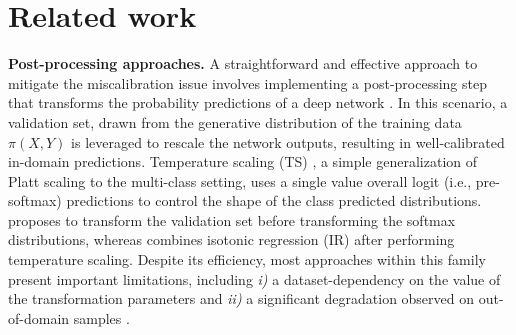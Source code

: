 \documentclass[twocolumn,final,10pt]{elsarticle}
\begin{document}
\section{Related work}
\label{sec:related}

\noindent \textbf{Post-processing approaches.} A straightforward and effective approach to mitigate the miscalibration issue involves implementing a post-processing step that transforms the probability predictions of a deep network \citep{guo2017calibration, zhang2020mix, tomani2021post}. In this scenario, a validation set, drawn from the generative distribution of the training data $\pi (X, Y)$ is leveraged to rescale the network outputs, resulting in well-calibrated in-domain predictions. Temperature scaling (TS) \citep{guo2017calibration}, a simple generalization of Platt scaling \citep{platt1999probabilistic} to the multi-class setting, %
uses a single value overall logit (i.e., pre-softmax) predictions to control the shape of the class predicted distributions. %
\citep{tomani2021post} proposes to transform the validation set before transforming the softmax distributions, whereas \citep{zhang2020mix} combines isotonic regression (IR) after performing temperature scaling.  %
Despite its efficiency, most approaches within this family present important limitations, including \textit{i)} a dataset-dependency on the value of the transformation parameters %
and \textit{ii)} a significant degradation observed on out-of-domain samples \citep{ovadia2019can}.
\end{document}
